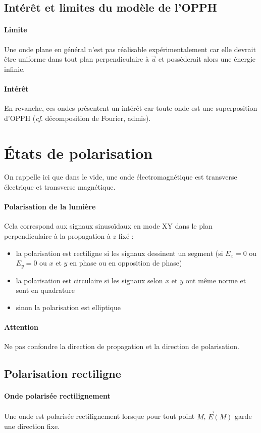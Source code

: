 \documentclass[french]{book}
\theoremstyle{plain}
\theoremstyle{definition}
\theoremstyle{remark}
\begin{document}
\subsection{Intérêt et limites du modèle de l'OPPH}
\paragraph{Limite} Une onde plane en général n'est pas réalisable expérimentalement car elle devrait être uniforme dans tout plan perpendiculaire à $\overrightarrow{u}$ et possèderait alors une énergie infinie.
\paragraph{Intérêt} En revanche, ces ondes présentent un intérêt car toute onde est une superposition d'OPPH (\textit{cf}. décomposition de Fourier, admis).
\section{États de polarisation}
On rappelle ici que dans le vide, une onde électromagnétique est transverse électrique et transverse magnétique.
\paragraph{Polarisation de la lumière} Cela correspond aux signaux sinusoïdaux en mode XY dans le plan perpendiculaire à la propagation à $z$ fixé : 
\begin{itemize}
	\item la polarisation est rectiligne si les signaux dessinent un segment (si $E_x=0$ ou $E_y=0$ ou $x$ et $y$ en phase ou en opposition de phase)
	\item la polarisation est circulaire si les signaux selon $x$ et $y$ ont même norme et sont en quadrature
	\item sinon la polarisation est elliptique
\end{itemize}
\paragraph{Attention} Ne pas confondre la direction de propagation et la direction de polarisation.
\subsection{Polarisation rectiligne}
\paragraph{Onde polarisée rectilignement} Une onde est polarisée rectilignement lorsque pour tout point $M$, $\overrightarrow{E}(M)$ garde une direction fixe.
\end{document}
